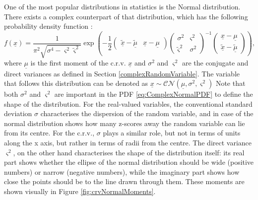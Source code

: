 \documentclass[
]{book}
\begin{document}
One of the most popular distributions in statistics is the Normal distribution. There exists a complex counterpart of that distribution, which has the following probability density function \citep{refGoodman}:
\begin{equation}
    f(\underline{x}) = \frac{1}{\pi^2 \sqrt{\sigma^4 - \varsigma^2 \tilde{\varsigma}^2}} \exp\left(- \frac{1}{2}
        \begin{pmatrix} \underline{\tilde{x}} - \underline{\tilde{\mu}} & \underline{x} - \underline{\mu} \end{pmatrix}
        \begin{pmatrix} \sigma^2 & \varsigma^2 \\ \tilde{\varsigma}^2 & \sigma^2 \end{pmatrix}^{-1}
        \begin{pmatrix} \underline{x} - \underline{\mu} \\ \underline{\tilde{x}} - \underline{\tilde{\mu}} \end{pmatrix}
    \right),
    \label{eq:ComplexNormalPDF}
\end{equation}
where \(\underline{\mu}\) is the first moment of the c.r.v. \(\underline{x}\) and \(\sigma^2\) and \(\varsigma^2\) are the conjugate and direct variances as defined in Section \ref{complexRandomVariable}. The variable that follows this distribution can be denoted as \(\underline{x} \sim \mathcal{CN}(\underline{\mu}, \sigma^2, \varsigma^2)\) Note that both \(\sigma^2\) and \(\varsigma^2\) are important in the PDF \eqref{eq:ComplexNormalPDF} to define the shape of the distribution. For the real-valued variables, the conventional standard deviation \(\sigma\) characterises the dispersion of the random variable, and in case of the normal distribution shows how many z-scores away the random variable can lie from its centre. For the c.r.v., \(\sigma\) plays a similar role, but not in terms of units along the x axis, but rather in terms of radii from the centre. The direct variance \(\varsigma^2\), on the other hand characterises the shape of the distribution itself: its real part shows whether the ellipse of the normal distribution should be wide (positive numbers) or narrow (negative numbers), while the imaginary part shows how close the points should be to the line drawn through them. These moments are shown visually in Figure \ref{fig:crvNormalMoments}.
\end{document}
